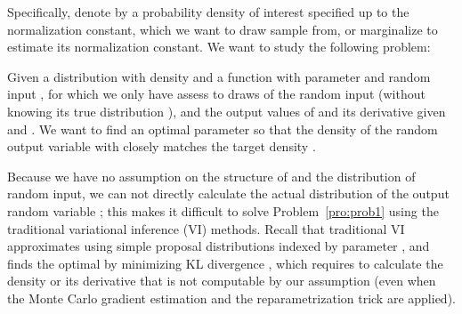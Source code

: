 \documentclass{article} \usepackage{iclr2017_conference,times}
\begin{document}
Specifically, denote by  a probability density of interest specified up to the normalization constant, which we want to draw sample from, or marginalize to estimate its normalization constant. We want to study the following problem: 

\begin{problem}\label{pro:prob1}
Given a distribution with density  and a function  with parameter  and random input , 
for which we only have assess to draws of the random input  (without knowing its true distribution ), 
and the output values of  and its derivative  given  and .  
We want to find an optimal parameter  so that the density of the random output variable  with  closely matches the target density . 
\end{problem}

Because we have no assumption on the structure of  
and the distribution of random input,
we can not directly calculate the actual distribution of the output random variable ; 
this makes it difficult to solve Problem~\ref{pro:prob1} using the traditional variational inference (VI) methods. 
Recall that traditional VI approximates  using simple proposal distributions  indexed by parameter , 
and finds the optimal  by minimizing KL divergence , 
which requires to calculate the density  or its derivative that is not computable by our assumption 
(even when the Monte Carlo gradient estimation and the reparametrization trick \citep{kingma2013auto} are applied).  
\end{document}
